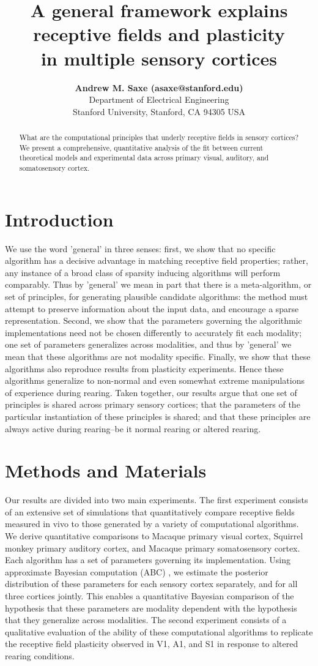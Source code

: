 \documentclass[10pt,letterpaper]{article}
\title{A general framework explains receptive fields and plasticity \\ in multiple sensory cortices}
\author{{\large \bf Andrew M. Saxe (asaxe@stanford.edu)} \\
  Department of Electrical Engineering \\
Stanford University, Stanford, CA 94305 USA}
\begin{document}
\maketitle

\begin{abstract}
What are the computational principles that underly receptive fields in sensory cortices? We present a comprehensive, quantitative analysis of the fit between current theoretical models and experimental data across primary visual, auditory, and somatosensory cortex. 
\end{abstract}

\section{Introduction}
We use the word 'general' in three senses: first, we show that no specific algorithm has a decisive advantage in matching receptive field properties; rather, any instance of a broad class of sparsity inducing algorithms will perform comparably. Thus by 'general' we mean in part that there is a meta-algorithm, or set of principles, for generating plausible candidate algorithms: the method must attempt to preserve information about the input data, and encourage a sparse representation. Second, we show that the parameters governing the algorithmic implementations need not be chosen differently to accurately fit each modality; one set of parameters generalizes across modalities, and thus by 'general' we mean that these algorithms are not modality specific. Finally, we show that these algorithms also reproduce results from plasticity experiments. Hence these algorithms generalize to non-normal and even somewhat extreme manipulations of experience during rearing. Taken together, our results argue that one set of principles is shared across primary sensory cortices;  that the parameters of the particular instantiation of these principles is shared; and that these principles are always active during rearing--be it normal rearing or altered rearing.

\section{Methods and Materials}
Our results are divided into two main experiments. The first experiment consists of an extensive set of simulations that quantitatively compare receptive fields measured in vivo to those generated by a variety of computational algorithms. We derive quantitative comparisons to Macaque primary visual cortex, Squirrel monkey primary auditory cortex, and Macaque primary somatosensory cortex. Each algorithm has a set of parameters governing its implementation. Using approximate Bayesian computation (ABC) \cite{...}, we estimate the posterior distribution of these parameters for each sensory cortex separately, and for all three cortices jointly. This enables a quantitative Bayesian comparison of the hypothesis that these parameters are modality dependent with the hypothesis that they generalize across modalities. The second experiment consists of a qualitative evaluation of the ability of these computational algorithms to replicate the receptive field plasticity observed in V1, A1, and S1 in response to altered rearing conditions.
\end{document}
